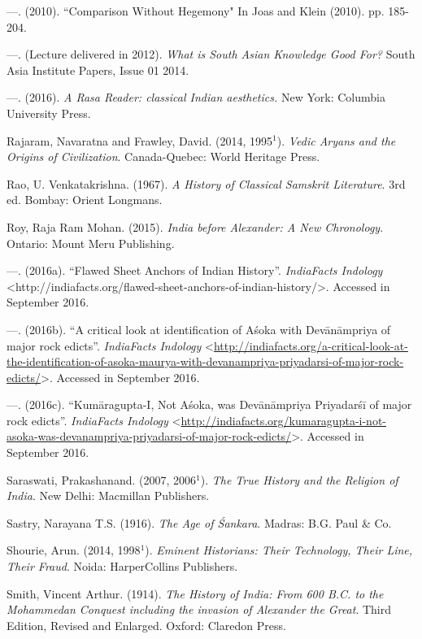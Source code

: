 \begin{thebibliography}{99}
  —. (2010). ``Comparison Without Hegemony" In Joas and Klein (2010). pp. 185-204.

  —. (Lecture delivered in 2012). \textit{What is South Asian Knowledge Good For?} South Asia Institute Papers, Issue 01 2014.

  —. (2016). \textit{A Rasa Reader: classical Indian aesthetics.} New York: Columbia University Press.

  Rajaram, Navaratna and Frawley, David. (2014, 1995$^{1}$). \textit{Vedic Aryans and the Origins of Civilization}. Canada-Quebec: World Heritage Press.

  Rao, U. Venkatakrishna. (1967). \textit{A History of Classical Samskrit Literature}. 3rd ed. Bombay: Orient Longmans.

  Roy, Raja Ram Mohan. (2015). \textit{India before Alexander: A New Chronology}. Ontario: Mount Meru Publishing.

  —. (2016a). “Flawed Sheet Anchors of Indian History”. \textit{IndiaFacts Indology} \textless http://indiafacts.org/flawed-sheet-anchors-of-indian-\break history/\textgreater.  Accessed in September 2016.

  —. (2016b). “A critical look at identification of Aśoka with Devānāmpriya of major rock edicts”. \textit{IndiaFacts Indology} \textless \url{http://indiafacts.org/a-critical-look-at-the-identification-of-asoka-maurya-with-devanampriya-priyadarsi-of-major-rock-edicts/}\textgreater.  Accessed in September 2016.

  —. (2016c). “Kumāragupta-I, Not Aśoka, was Devānāmpriya Priyadarśī of major rock edicts”. \textit{IndiaFacts Indology} \textless \url{http://indiafacts.org/kumaragupta-i-not-asoka-was-devanampriya-priyadarsi-of-major-rock-edicts/}\textgreater.  Accessed in September 2016.

  Saraswati, Prakashanand. (2007, 2006$^{1}$). \textit{The True History and the Religion of India}. New Delhi: Macmillan Publishers.

  Sastry, Narayana T.S. (1916). \textit{The Age of Śankara}. Madras: B.G. Paul \& Co.

  Shourie, Arun. (2014, 1998$^{1}$). \textit{Eminent Historians: Their Technology, Their Line, Their Fraud}. Noida: HarperCollins Publishers.

  Smith, Vincent Arthur. (1914). \textit{The History of India: From 600 B.C. to the Mohammedan Conquest including the invasion of Alexander the Great}. Third Edition, Revised and Enlarged. Oxford: Claredon Press.


\end{thebibliography}
